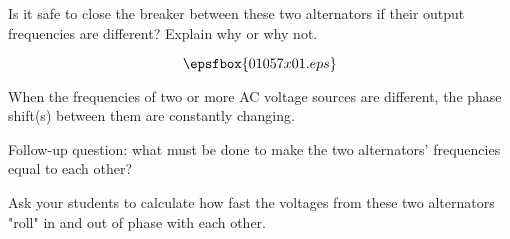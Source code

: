 

Is it safe to close the breaker between these two alternators if their output frequencies are different?  Explain why or why not.

$$\epsfbox{01057x01.eps}$$







When the frequencies of two or more AC voltage sources are different, the phase shift(s) between them are constantly changing.

\vskip 10pt

Follow-up question: what must be done to make the two alternators' frequencies equal to each other?







Ask your students to calculate how fast the voltages from these two alternators "roll" in and out of phase with each other.




